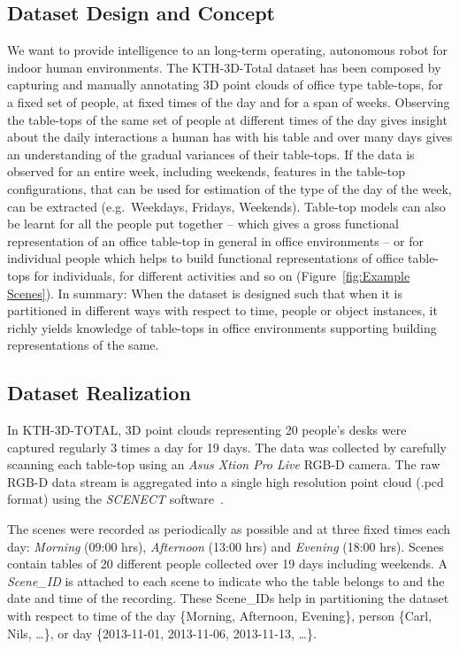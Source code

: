 \documentclass[letterpaper, 10 pt, conference]{ieeeconf}  %
\begin{document}
\subsection{Dataset Design and Concept}
\label{ssec:Dataset Design and Concept}
We want to provide intelligence to an long-term operating, autonomous robot for indoor human environments. The KTH-3D-Total
dataset has been composed by capturing and manually annotating 3D point clouds of office type table-tops, for a fixed set of 
people, at fixed times of the 
day and for a span of weeks. Observing the table-tops of the same set of people at different times of the day gives insight about the daily 
interactions a human has with his table and over many days gives an understanding of the gradual variances of their table-tops. If the data 
is observed for an entire week, including weekends, features in the table-top configurations, that can be used for estimation of the type of 
the day of the week, can be extracted (e.g.\ Weekdays, Fridays, Weekends). Table-top models can also be learnt for all the people put 
together -- which gives a gross functional representation of an office table-top in general in office environments -- or for individual 
people which helps to build functional representations of office table-tops for individuals, for different activities and so on 
(Figure~\ref{fig:Example Scenes}). 
In summary: When the dataset is designed such that when it is partitioned in different ways with respect to time, people or object instances, it richly yields knowledge 
of table-tops in office environments supporting building representations of the same.

\subsection{Dataset Realization}
\label{ssec:Dataset Realization}
In KTH-3D-TOTAL, 3D point clouds representing 20 people's desks were captured regularly 3 times a day for 19 days. The data was collected by 
carefully scanning each table-top using an \textit{Asus Xtion Pro Live} RGB-D camera. The raw RGB-D data stream is aggregated into a single 
high resolution point cloud (.pcd format) using the \textit{SCENECT} software~\cite{Buerkler:Online2012}.

The scenes were recorded as periodically as possible and at three fixed times each day: \emph{Morning} (09:00 hrs), \emph{Afternoon} (13:00 
hrs) and \emph{Evening} (18:00 hrs). Scenes contain tables of 20 different people collected over 19 days including weekends. 
A \textit{Scene\_ID} is attached to each scene to indicate who the table belongs to and the date and time of the recording. These Scene\_IDs help in partitioning the dataset with respect to time of the day \{Morning, Afternoon, Evening\}, person \{Carl, Nils, \dots\}, or day \{2013-11-01, 2013-11-06, 2013-11-13, \dots\}.
\end{document}
